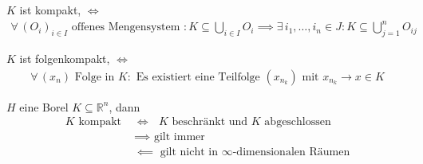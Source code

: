 \begin{theorem*}[Definition]
  $K$ ist kompakt, $\iff$ 
  \begin{align*}
    \text{$\forall \, (O_i)_{i \in I}$ offenes Mengensystem } : K \subseteq \bigcup\limits_{i \in I} O_i \implies \exists \, i_1, \ldots, i_n \in J : K \subseteq \bigcup\limits_{j=1}^{n} O_{ij}
  \end{align*}
  
  $K$ ist folgenkompakt, $\iff$
  \begin{align*}
    \forall \, (x_n) \text{ Folge in } K : \text{ Es existiert eine Teilfolge } (x_{n_k}) \text{ mit } x_{n_k} \to x \in K
  \end{align*}
  
  $H$ eine Borel $K \subseteq \mathbb{R}^n$, dann
  \begin{align*}
    \text{$K$ kompakt }
    &\iff \text{ $K$ beschränkt und $K$ abgeschlossen} \\
    &\implies \text{ gilt immer} \\
    &\impliedby \text{ gilt nicht in $\infty$-dimensionalen Räumen}
  \end{align*}
\end{theorem*}

